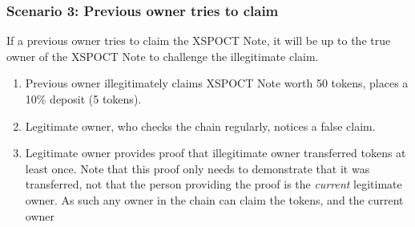 \subsubsection{Scenario 3: Previous owner tries to claim}
If a previous owner tries to claim the XSPOCT Note, it will be up to the true owner of the XSPOCT Note to challenge the illegitimate claim. 
\begin{enumerate}
  \item Previous owner illegitimately claims XSPOCT Note worth 50 tokens, places a 10\% deposit (5 tokens).
  \item Legitimate owner, who checks the chain regularly, notices a false claim.
  \item Legitimate owner provides proof that illegitimate owner transferred tokens at least once. Note that this proof only needs to demonstrate that it was transferred, not that the person providing the proof is the \textit{current} legitimate owner. As such any owner in the chain can claim the tokens, and the current owner 
\end{enumerate}